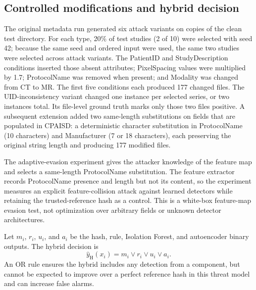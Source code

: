 \documentclass[journal]{IEEEtran}
\begin{document}
  \subsection{Controlled modifications and hybrid decision}
  The original metadata run generated six attack variants on copies of the clean test directory. For each type, 20\% of test studies (2 of 10) were selected with seed 42; because the same seed and ordered input were used, the same two studies were selected across attack variants. The PatientID and StudyDescription conditions inserted those absent attributes; PixelSpacing values were multiplied by 1.7; ProtocolName was removed when present; and Modality was changed from CT to MR. The first five conditions each produced 177 changed files. The UID-inconsistency variant changed one instance per selected series, or two instances total. Its file-level ground truth marks only those two files positive. A subsequent extension added two same-length substitutions on fields that are populated in CPAISD: a deterministic character substitution in ProtocolName (10 characters) and Manufacturer (7 or 18 characters), each preserving the original string length and producing 177 modified files.
  
  The adaptive-evasion experiment gives the attacker knowledge of the feature map and selects a same-length ProtocolName substitution. The feature extractor records ProtocolName presence and length but not its content, so the experiment measures an explicit feature-collision attack against learned detectors while retaining the trusted-reference hash as a control. This is a white-box feature-map evasion test, not optimization over arbitrary fields or unknown detector architectures.
  
  Let $m_i$, $r_i$, $u_i$, and $a_i$ be the hash, rule, Isolation Forest, and autoencoder binary outputs. The hybrid decision is
  \begin{equation}
  \hat y_{\mathrm{H}}(x_i)=m_i\lor r_i\lor u_i\lor a_i.
  \end{equation}
  An OR rule ensures the hybrid includes any detection from a component, but cannot be expected to improve over a perfect reference hash in this threat model and can increase false alarms.
  
\end{document}

